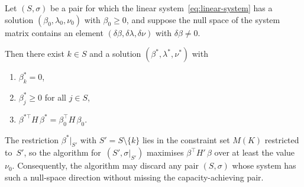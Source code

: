%
%

\begin{lemma}%
\label{lem:rank-deficiency-dismissal}
Let $(S, \sigma)$ be a pair for which the linear
system~\eqref{eq:linear-system} has a solution
$(\beta_0, \lambda_0, \nu_0)$ with $\beta_0 \geq 0$,
and suppose the null space of the system matrix contains an element
$(\delta\beta, \delta\lambda, \delta\nu)$ with
$\delta\beta \neq 0$.

Then there exist $k \in S$ and a solution
$(\beta^*, \lambda^*, \nu^*)$ with
\begin{enumerate}
\item $\beta^*_k = 0$,
\item $\beta^*_j \geq 0$ for all $j \in S$,
\item $\beta^{*\top} H\, \beta^* = \beta_0^\top H\, \beta_0$.
\end{enumerate}
The restriction $\beta^*|_{S'}$ with $S' = S \setminus \{k\}$
lies in the constraint set $M(K)$ restricted to~$S'$,
so the algorithm for~$(S', \sigma|_{S'})$ maximises
$\beta^\top H'\, \beta$ over at least the value~$\nu_0$.
Consequently, the algorithm may discard any pair $(S, \sigma)$
whose system has such a null-space direction
without missing the capacity-achieving pair.
\end{lemma}

